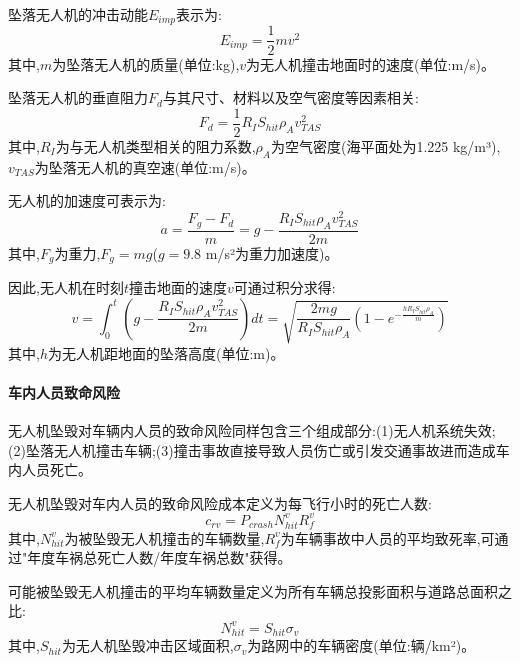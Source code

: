 坠落无人机的冲击动能$E_{imp}$表示为:
\begin{equation}
E_{imp} = \frac{1}{2} m v^2
\label{eq:impact_energy}
\end{equation}
其中,$m$为坠落无人机的质量(单位:kg),$v$为无人机撞击地面时的速度(单位:m/s)。

坠落无人机的垂直阻力$F_d$与其尺寸、材料以及空气密度等因素相关:
\begin{equation}
F_d = \frac{1}{2} R_I S_{hit} \rho_A v_{TAS}^2
\label{eq:drag_force}
\end{equation}
其中,$R_I$为与无人机类型相关的阻力系数,$\rho_A$为空气密度(海平面处为1.225 kg/m³),$v_{TAS}$为坠落无人机的真空速(单位:m/s)。

无人机的加速度可表示为:
\begin{equation}
a = \frac{F_g - F_d}{m} = g - \frac{R_I S_{hit} \rho_A v_{TAS}^2}{2m}
\label{eq:acceleration}
\end{equation}
其中,$F_g$为重力,$F_g=mg$($g=9.8$ m/s²为重力加速度)。

因此,无人机在时刻$t$撞击地面的速度$v$可通过积分求得:
\begin{equation}
v = \int_0^t \left(g - \frac{R_I S_{hit} \rho_A v_{TAS}^2}{2m}\right) dt = \sqrt{\frac{2mg}{R_I S_{hit} \rho_A} \left(1 - e^{-\frac{h R_I S_{hit} \rho_A}{m}}\right)}
\label{eq:impact_velocity}
\end{equation}
其中,$h$为无人机距地面的坠落高度(单位:m)。

\paragraph{车内人员致命风险}

无人机坠毁对车辆内人员的致命风险同样包含三个组成部分:(1)无人机系统失效;(2)坠落无人机撞击车辆;(3)撞击事故直接导致人员伤亡或引发交通事故进而造成车内人员死亡。

无人机坠毁对车内人员的致命风险成本定义为每飞行小时的死亡人数:
\begin{equation}
c_{rv} = P_{crash} N_{hit}^v R_f^v
\label{eq:vehicle_fatality}
\end{equation}
其中,$N_{hit}^v$为被坠毁无人机撞击的车辆数量,$R_f^v$为车辆事故中人员的平均致死率,可通过"年度车祸总死亡人数/年度车祸总数"获得。

可能被坠毁无人机撞击的平均车辆数量定义为所有车辆总投影面积与道路总面积之比:
\begin{equation}
N_{hit}^v = S_{hit} \sigma_v
\label{eq:vehicle_hit_count}
\end{equation}
其中,$S_{hit}$为无人机坠毁冲击区域面积,$\sigma_v$为路网中的车辆密度(单位:辆/km²)。

